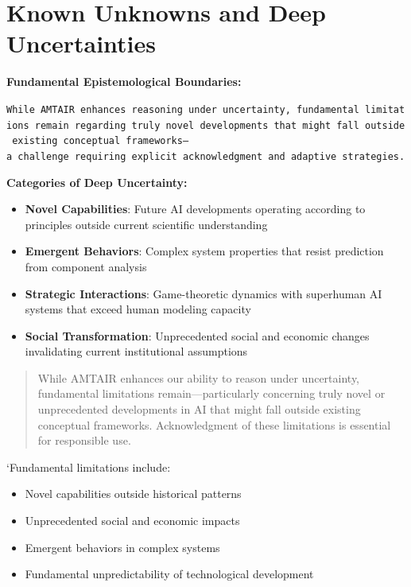 \documentclass[
  11pt,
  letterpaper,
]{book}
\providecommand{\tightlist}{%
  \setlength{\itemsep}{0pt}\setlength{\parskip}{0pt}}
\begin{document}
\section{Known Unknowns and Deep
Uncertainties}\label{sec-deep-uncertainties}

\textbf{Fundamental Epistemological Boundaries:}

\texttt{While\ AMTAIR\ enhances\ reasoning\ under\ uncertainty,\ fundamental\ limitations\ remain\ regarding\ truly\ novel\ developments\ that\ might\ fall\ outside\ existing\ conceptual\ frameworks—a\ challenge\ requiring\ explicit\ acknowledgment\ and\ adaptive\ strategies.}

\textbf{Categories of Deep Uncertainty:}

\begin{itemize}
\tightlist
\item
  \textbf{Novel Capabilities}: Future AI developments operating
  according to principles outside current scientific understanding
\item
  \textbf{Emergent Behaviors}: Complex system properties that resist
  prediction from component analysis
\item
  \textbf{Strategic Interactions}: Game-theoretic dynamics with
  superhuman AI systems that exceed human modeling capacity
\item
  \textbf{Social Transformation}: Unprecedented social and economic
  changes invalidating current institutional assumptions
\end{itemize}

\begin{quote}
While AMTAIR enhances our ability to reason under uncertainty,
fundamental limitations remain---particularly concerning truly novel or
unprecedented developments in AI that might fall outside existing
conceptual frameworks. Acknowledgment of these limitations is essential
for responsible use.
\end{quote}

`Fundamental limitations include:

\begin{itemize}
\tightlist
\item
  Novel capabilities outside historical patterns
\item
  Unprecedented social and economic impacts
\item
  Emergent behaviors in complex systems
\item
  Fundamental unpredictability of technological development
\end{itemize}
\end{document}
